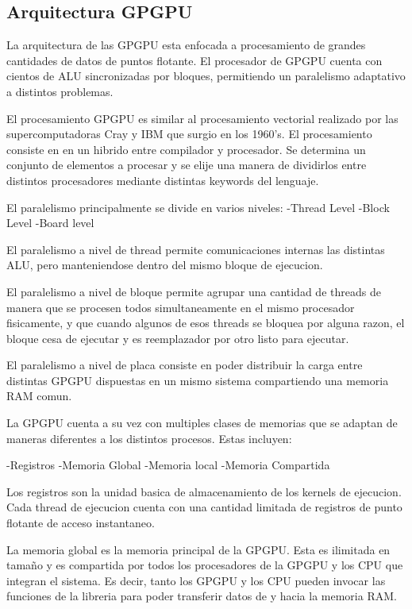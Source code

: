 \subsection{Arquitectura GPGPU}
La arquitectura de las GPGPU esta enfocada a procesamiento de grandes cantidades de datos
de puntos flotante. El procesador de GPGPU cuenta con cientos de ALU sincronizadas
por bloques, permitiendo un paralelismo adaptativo a distintos problemas.

El procesamiento GPGPU es similar al procesamiento vectorial 
realizado por las supercomputadoras Cray y IBM que surgio en los 1960's.
El procesamiento consiste en en un hibrido entre compilador y procesador. Se determina
un conjunto de elementos a procesar y se elije una manera de dividirlos entre distintos
procesadores mediante distintas keywords del lenguaje. 

El paralelismo principalmente se divide en varios niveles:
-Thread Level
-Block Level
-Board level

El paralelismo a nivel de thread permite comunicaciones internas las distintas ALU, pero
manteniendose dentro del mismo bloque de ejecucion.

El paralelismo a nivel de bloque permite agrupar una cantidad de threads de manera
que se procesen todos simultaneamente en el mismo procesador fisicamente, y que
cuando algunos de esos threads se bloquea por alguna razon, el bloque cesa de ejecutar
y es reemplazador por otro listo para ejecutar.

El paralelismo a nivel de placa consiste en poder distribuir la carga entre distintas
GPGPU dispuestas en un mismo sistema compartiendo una memoria RAM comun. 

La GPGPU cuenta a su vez con multiples clases de memorias que se adaptan de maneras
diferentes a los distintos procesos. Estas incluyen:

-Registros
-Memoria Global
-Memoria local
-Memoria Compartida

Los registros son la unidad basica de almacenamiento de los kernels de ejecucion.
Cada thread de ejecucion cuenta con una cantidad limitada de registros de punto flotante de
acceso instantaneo. 

La memoria global es la memoria principal de la GPGPU. Esta es ilimitada en tama\~no 
y es compartida por todos los procesadores de la GPGPU y los CPU que integran el 
sistema. Es decir, tanto los GPGPU y los CPU pueden invocar las funciones de la libreria
para poder transferir datos de y hacia la memoria RAM.


